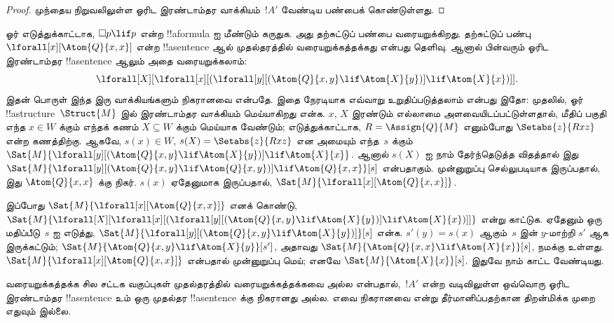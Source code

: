 \documentclass[../../../include/open-logic-section]{subfiles}
\begin{document}
\begin{proof}
  முந்தைய நிறுவலிலுள்ள ஓரிட இரண்டாம்தர வாக்கியம்~$!A'$ வேண்டிய பண்பைக்
  கொண்டுள்ளது.
\end{proof}

ஓர் எடுத்துக்காட்டாக, $\Box p \lif p$ என்ற !!a{formula} ஐ மீண்டும் கருதுக.
அது தற்சுட்டுப் பண்பை வரையறுக்கிறது. தற்சுட்டுப் பண்பு
$\lforall[x][\Atom{Q}{x,x}]$ என்ற !!a{sentence} ஆல் முதல்தரத்தில்
வரையறுக்கத்தக்கது என்பது தெளிவு. ஆனால் பின்வரும் ஓரிட இரண்டாம்தர
!!a{sentence} ஆலும் அதை வரையறுக்கலாம்:
\[
\lforall[X][\lforall[x][(\lforall[y][(\Atom{Q}{x,y} \lif \Atom{X}{y})]
    \lif \Atom{X}{x})]].
\]
இதன் பொருள் இந்த இரு வாக்கியங்களும் நிகரானவை என்பதே. இதை நேரடியாக எவ்வாறு
உறுதிப்படுத்தலாம் என்பது இதோ: முதலில், ஓர் !!a{structure}~$\Struct{M}$ இல்
இரண்டாம்தர வாக்கியம் மெய்யாகிறது என்க. $x$, $X$ இரண்டும் எல்லாமை
அளவையிடப்பட்டுள்ளதால், மீதிப் பகுதி எந்த $x \in W$ க்கும் எந்தக் கணம்
$X \subseteq W$ க்கும் மெய்யாக வேண்டும்; எடுத்துக்காட்டாக, $R =
\Assign{Q}{M}$ எனும்போது $\Setabs{z}{Rxz}$ என்ற கணத்திற்கு. ஆகவே,
$s(x) \in W$, $s(X) = \Setabs{z}{Rxz}$ என அமையும் எந்த~$s$ க்கும்
$\Sat{M}{\lforall[y][(\Atom{Q}{x,y} \lif \Atom{X}{y})] \lif
    \Atom{X}{x}}$. ஆனால் $s(X)$ ஐ நாம் தேர்ந்தெடுத்த விதத்தால் இது
$\Sat{M}{\lforall[y][(\Atom{Q}{x,y} \lif \Atom{Q}{x,y})] \lif
    \Atom{Q}{x,x}}[s]$ என்பதாகும். முன்னுறுப்பு செல்லுபடியாக இருப்பதால்,
இது $\Atom{Q}{x,x}$ க்கு நிகர். $s(x)$ ஏதேனுமாக இருப்பதால்,
$\Sat{M}{\lforall[x][\Atom{Q}{x,x}]}$.

இப்போது $\Sat{M}{\lforall[x][\Atom{Q}{x,x}]}$ எனக் கொண்டு,
$\Sat{M}{\lforall[X][\lforall[x][(\lforall[y][(\Atom{Q}{x,y} \lif
        \Atom{X}{y})] \lif \Atom{X}{x})]]}$ என்று காட்டுக. ஏதேனும் ஒரு
மதிப்பீடு~$s$ ஐ எடுத்து, $\Sat{M}{\lforall[y][(\Atom{Q}{x,y} \lif
    \Atom{X}{y})]}[s]$ என்க. $s'(y) = s(x)$ ஆகும்~$s$ இன் $y$-மாற்றி
$s'$ ஆக இருக்கட்டும்; $\Sat{M}{\Atom{Q}{x,y} \lif \Atom{X}{y}}[s']$,
அதாவது $\Sat{M}{\Atom{Q}{x,x} \lif \Atom{X}{x}}[s]$, நமக்கு உள்ளது.
$\Sat{M}{\lforall[x][\Atom{Q}{x,x}]}$ என்பதால் முன்னுறுப்பு மெய்; எனவே
$\Sat{M}{\Atom{X}{x}}[s]$. இதுவே நாம் காட்ட வேண்டியது.

வரையறுக்கத்தக்க சில சட்டக வகுப்புகள் முதல்தரத்தில் வரையறுக்கத்தக்கவை
அல்ல என்பதால்,~$!A'$ என்ற வடிவிலுள்ள ஒவ்வொரு ஓரிட இரண்டாம்தர
!!a{sentence} உம் ஒரு முதல்தர !!a{sentence} க்கு நிகரானது அல்ல. எவை
நிகரானவை என்று தீர்மானிப்பதற்கான திறன்மிக்க முறை எதுவும் இல்லை.
\end{document}
